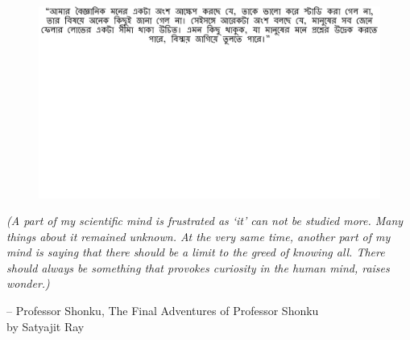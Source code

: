 \thispagestyle{empty}
{}

\vspace*{3cm}

\begin{center}
\begin{figure}
  \centering
  	\vspace{5cm}
    \includegraphics[width=\linewidth]{preamble/quote_1.pdf} 
\end{figure}
\vspace{-4cm}
\small
\emph{(A part of my scientific mind is frustrated as `it' can not be studied more. Many things about it remained unknown. At the very same time, another part of my mind is saying that there should be a limit to the greed of knowing all. There should always be something that provokes curiosity in the human mind, raises wonder.)}

\vspace{2em}
 -- Professor Shonku, The Final Adventures of Professor Shonku\\
 by Satyajit Ray 
\end{center}

\medskip
